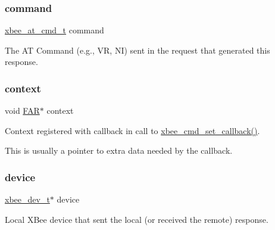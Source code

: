 \subsubsection{\texorpdfstring{command}{command}}
{\footnotesize\ttfamily \hyperlink{unionxbee__at__cmd__t}{xbee\+\_\+at\+\_\+cmd\+\_\+t} command}



The AT Command (e.\+g., VR, NI) sent in the request that generated this response. 

\mbox{\label{structxbee__cmd__response__t_aa91f8e864e06077c354e5f5216547758}} 
\subsubsection{\texorpdfstring{context}{context}}
{\footnotesize\ttfamily void \hyperlink{group__hal_gaef060b3456fdcc093a7210a762d5f2ed}{F\+AR}$\ast$ context}



Context registered with callback in call to \hyperlink{group__xbee__atcmd_ga0a5d2e2e87743061c46abd53e379e014}{xbee\+\_\+cmd\+\_\+set\+\_\+callback()}. 

This is usually a pointer to extra data needed by the callback. \mbox{\label{structxbee__cmd__response__t_ac780e07a2b2cd8df18f56240588090c5}} 
\subsubsection{\texorpdfstring{device}{device}}
{\footnotesize\ttfamily \hyperlink{structxbee__dev__t}{xbee\+\_\+dev\+\_\+t}$\ast$ device}



Local X\+Bee device that sent the local (or received the remote) response. 

\mbox{\label{structxbee__cmd__response__t_a1e87af3c18a2fd36c61faf89949bdc3f}} 
